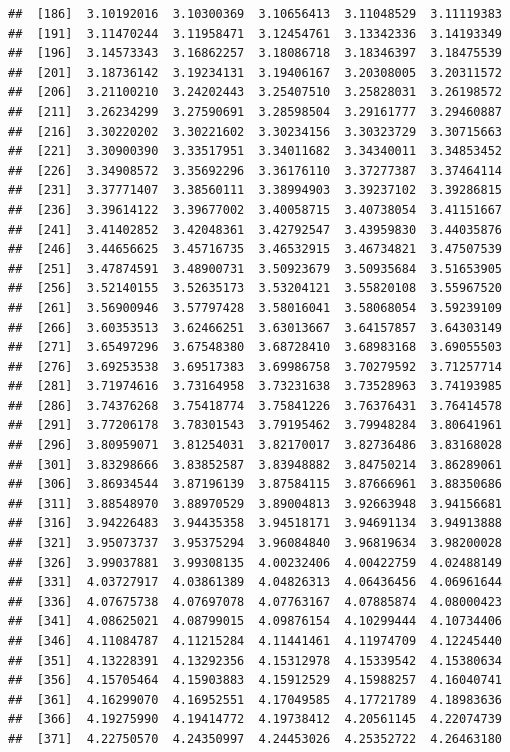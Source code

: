 \documentclass[
  11pt]{report}
\begin{document}
\begin{itemize}
\begin{verbatim}
##  [186]  3.10192016  3.10300369  3.10656413  3.11048529  3.11119383
##  [191]  3.11470244  3.11958471  3.12454761  3.13342336  3.14193349
##  [196]  3.14573343  3.16862257  3.18086718  3.18346397  3.18475539
##  [201]  3.18736142  3.19234131  3.19406167  3.20308005  3.20311572
##  [206]  3.21100210  3.24202443  3.25407510  3.25828031  3.26198572
##  [211]  3.26234299  3.27590691  3.28598504  3.29161777  3.29460887
##  [216]  3.30220202  3.30221602  3.30234156  3.30323729  3.30715663
##  [221]  3.30900390  3.33517951  3.34011682  3.34340011  3.34853452
##  [226]  3.34908572  3.35692296  3.36176110  3.37277387  3.37464114
##  [231]  3.37771407  3.38560111  3.38994903  3.39237102  3.39286815
##  [236]  3.39614122  3.39677002  3.40058715  3.40738054  3.41151667
##  [241]  3.41402852  3.42048361  3.42792547  3.43959830  3.44035876
##  [246]  3.44656625  3.45716735  3.46532915  3.46734821  3.47507539
##  [251]  3.47874591  3.48900731  3.50923679  3.50935684  3.51653905
##  [256]  3.52140155  3.52635173  3.53204121  3.55820108  3.55967520
##  [261]  3.56900946  3.57797428  3.58016041  3.58068054  3.59239109
##  [266]  3.60353513  3.62466251  3.63013667  3.64157857  3.64303149
##  [271]  3.65497296  3.67548380  3.68728410  3.68983168  3.69055503
##  [276]  3.69253538  3.69517383  3.69986758  3.70279592  3.71257714
##  [281]  3.71974616  3.73164958  3.73231638  3.73528963  3.74193985
##  [286]  3.74376268  3.75418774  3.75841226  3.76376431  3.76414578
##  [291]  3.77206178  3.78301543  3.79195462  3.79948284  3.80641961
##  [296]  3.80959071  3.81254031  3.82170017  3.82736486  3.83168028
##  [301]  3.83298666  3.83852587  3.83948882  3.84750214  3.86289061
##  [306]  3.86934544  3.87196139  3.87584115  3.87666961  3.88350686
##  [311]  3.88548970  3.88970529  3.89004813  3.92663948  3.94156681
##  [316]  3.94226483  3.94435358  3.94518171  3.94691134  3.94913888
##  [321]  3.95073737  3.95375294  3.96084840  3.96819634  3.98200028
##  [326]  3.99037881  3.99308135  4.00232406  4.00422759  4.02488149
##  [331]  4.03727917  4.03861389  4.04826313  4.06436456  4.06961644
##  [336]  4.07675738  4.07697078  4.07763167  4.07885874  4.08000423
##  [341]  4.08625021  4.08799015  4.09876154  4.10299444  4.10734406
##  [346]  4.11084787  4.11215284  4.11441461  4.11974709  4.12245440
##  [351]  4.13228391  4.13292356  4.15312978  4.15339542  4.15380634
##  [356]  4.15705464  4.15903883  4.15912529  4.15988257  4.16040741
##  [361]  4.16299070  4.16952551  4.17049585  4.17721789  4.18983636
##  [366]  4.19275990  4.19414772  4.19738412  4.20561145  4.22074739
##  [371]  4.22750570  4.24350997  4.24453026  4.25352722  4.26463180

\end{verbatim}
\end{itemize}
\end{document}
